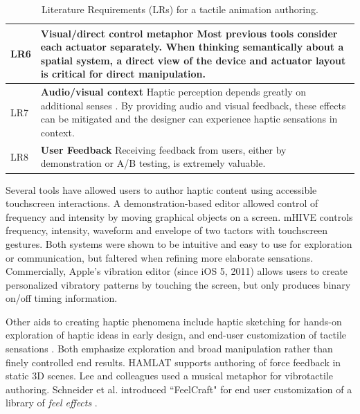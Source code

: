 \begin{table}
\begin{tabular}{|l|p{}|}
		LR6 &
		\textbf{Visual/direct control metaphor}
		\cite{Kim2009,Paneels2013,Cuartielles2012}
		 Most previous tools consider each actuator separately.
		 When thinking semantically about a spatial system, a direct view of the device and actuator layout is critical for direct manipulation.
	\\
	\hline
		LR7 &
		\textbf{Audio/visual context}
		\cite{Kim2009,Swindells2014,Moussette2011}
		 Haptic perception depends greatly on additional senses \cite{Hayward2008}. %
		By providing audio and visual feedback, these effects can be mitigated and the designer can experience haptic sensations in context.
	\\
	\hline
		LR8 &
		\textbf{User Feedback}
		 \cite{Schneider2014,Swindells2014}
		 Receiving feedback from users, either by demonstration or A/B testing, is extremely valuable.
	\\
	

	\hline
	\end{tabular}
	\caption{Literature Requirements (LRs) for a tactile animation authoring.}
	\label{tab:design:literature:requirements}
\end{table}


Several tools have allowed users to author haptic content using accessible touchscreen interactions.
A demonstration-based editor \cite{Hong2013} allowed control of frequency and intensity by moving graphical objects on a screen.
mHIVE \cite{Schneider2014} controls frequency, intensity, waveform and envelope of two tactors with touchscreen gestures.
Both systems were shown to be intuitive and easy to use for exploration or communication, but faltered when refining more elaborate sensations. %
Commercially, Apple's vibration editor (since iOS 5, 2011)  allows users to create personalized vibratory patterns by touching the screen, but only produces binary on/off timing information.


Other aids to creating haptic phenomena include haptic sketching \cite{Moussette2011} for hands-on exploration of haptic ideas in early design, and end-user customization of tactile sensations \cite{Seifi2014}.
Both emphasize exploration and broad manipulation rather than finely controlled end results.
HAMLAT \cite{Ferre2008} supports authoring of force feedback in static 3D scenes. 
Lee and colleagues \cite{Lee2012} used a musical metaphor for vibrotactile authoring.
Schneider et al. introduced ``FeelCraft" for end user customization of
a library of \emph{feel effects} \cite{SchneiderAsiaHaptics2014}.

